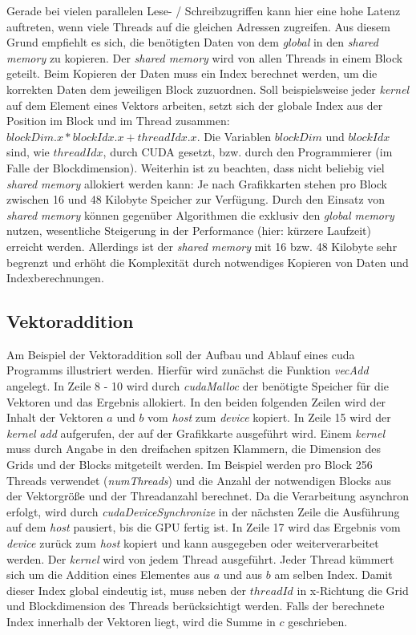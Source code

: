 Gerade bei vielen parallelen Lese- / Schreibzugriffen kann hier eine hohe Latenz auftreten, wenn viele Threads auf die gleichen Adressen zugreifen. Aus diesem Grund empfiehlt es sich, die benötigten Daten von dem \textit{global} in den \textit{shared memory} zu kopieren. Der \textit{shared memory} wird von allen Threads in einem Block geteilt. Beim Kopieren der Daten muss ein Index berechnet werden, um die korrekten Daten dem jeweiligen Block zuzuordnen. Soll beispielsweise jeder \textit{kernel} auf dem Element eines Vektors arbeiten, setzt sich der globale Index aus der Position im Block und im Thread zusammen: $blockDim.x * blockIdx.x + threadIdx.x$. Die Variablen $blockDim$ und $blockIdx$ sind, wie $threadIdx$, durch CUDA gesetzt, bzw. durch den Programmierer (im Falle der Blockdimension). Weiterhin ist zu beachten, dass nicht beliebig viel \textit{shared memory} allokiert werden kann: Je nach Grafikkarten stehen pro Block zwischen 16 und 48 Kilobyte Speicher zur Verfügung. 
Durch den Einsatz von \textit{shared memory} können gegenüber Algorithmen die exklusiv den \textit{global memory} nutzen, wesentliche Steigerung in der Performance (hier: kürzere Laufzeit) erreicht werden. Allerdings ist der \textit{shared memory} mit 16 bzw. 48 Kilobyte sehr begrenzt und erhöht die Komplexität durch notwendiges Kopieren von Daten und Indexberechnungen.

\subsection{Vektoraddition}

Am Beispiel der Vektoraddition soll der Aufbau und Ablauf eines cuda Programms illustriert werden. Hierfür wird zunächst die Funktion \textit{vecAdd} angelegt. In Zeile 8 - 10 wird durch \textit{cudaMalloc} der benötigte Speicher für die Vektoren und das Ergebnis allokiert. In den beiden folgenden Zeilen wird der Inhalt der Vektoren $a$ und $b$ vom \textit{host} zum \textit{device} kopiert. In Zeile 15 wird der \textit{kernel} \textit{add} aufgerufen, der auf der Grafikkarte ausgeführt wird. Einem \textit{kernel} muss durch Angabe in den dreifachen spitzen Klammern, die Dimension des Grids und der Blocks mitgeteilt werden. Im Beispiel werden pro Block 256 Threads verwendet (\textit{numThreads}) und die Anzahl der notwendigen Blocks aus der Vektorgröße und der Threadanzahl berechnet. Da die Verarbeitung asynchron erfolgt, wird durch \textit{cudaDeviceSynchronize} in der nächsten Zeile die Ausführung auf dem \textit{host} pausiert, bis die GPU fertig ist. In Zeile 17 wird das Ergebnis vom \textit{device} zurück zum \textit{host} kopiert und kann ausgegeben oder weiterverarbeitet werden.
Der \textit{kernel} wird von jedem Thread ausgeführt. Jeder Thread kümmert sich um die Addition eines Elementes aus $a$ und aus $b$ am selben Index. Damit dieser Index global eindeutig ist, muss neben der $threadId$ in x-Richtung die Grid und Blockdimension des Threads berücksichtigt werden. Falls der berechnete Index innerhalb der Vektoren liegt, wird die Summe in $c$ geschrieben.

